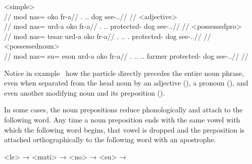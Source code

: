 	\a<simple>\begingl
		\glpreamble{}\\
		//
		\gla mod nas= oko fr-a//
		\glb \Fps.\Erg{} \An.\Pc.\Top{} dog see-\Ind.\Npst.\Ipfv//
		\glft{}//
	\endgl
	\a<adjective>\begingl
		\glpreamble{}\\
		//
		\gla mod nas= urd-a oko fr-a//
		\glb \Fps.\Erg{} \An.\Pc.\Top{} protected-\An{} dog see-\Ind.\Npst.\Ipfv//
		\glft{}//
	\endgl
	\a<possessedpro>\begingl
		\glpreamble{}\\
		//
		\gla mod nas= tesar urd-a oko fr-a//
		\glb \Fps.\Erg{} \An.\Pc.\Top{} \Spc.\Gen{} protected-\An{} dog see-\Ind.\Npst.\Ipfv//
		\glft{}//
	\endgl
	\a<possessednoun>\begingl
		\glpreamble{}\\
		//
		\gla mod nas= su= eson urd-a oko fr-a//
		\glb \Fps.\Erg{} \An.\Pc.\Top{} \An.\Sg.\Gen{} farmer protected-\An{} dog see-\Ind.\Npst.\Ipfv//
		\glft{}//
	\endgl
\xe

Notice in example~ how the particle  directly precedes the entire noun phrase, even when separated from the head noun by an adjective (), a pronoun (), and even another modifying noun and its preposition ().

In some cases, the noun prepositions reduce phonologically and attach to the following word. Any time a noun preposition ends with the same vowel with which the following word begins, that vowel is dropped and the preposition is attached orthographically to the following word with an apostrophe.

	\a<le> →    
	\a<mati> →    
	\a<no> →    
	\a<su> →    
\xe

